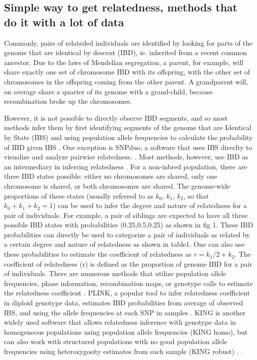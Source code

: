 \documentclass[12pt, letterpaper]{article}
\begin{document}
\subsection{Simple way to get relatedness, methods that do it with a lot of data}
Commonly, pairs of relateded individuals are  identified by looking for parts of the genome that are identical by descent (IBD), ie. inherited from a recent common ancestor. Due to the laws of Mendelian segregation, a parent, for example, will share exactly one set of chromosome IBD with its offspring, with the other set of chromosomes in the offspring coming from the other parent. A grandparent will, on average share a quarter of its genome with a grand-child, because recombination broke up the chromosomes.

However, it is not possible to directly observe IBD segments, and so most methods infer them by first identifying segments of the genome that are Identical by State (IBS) and using population allele frequencies to calculate the probability of IBD given IBS \cite{vai_kinship_2020}.  One exception is SNPduo, a software that uses IBS direclty to visualize and analyze pairwise relatedness. \cite{roberson_visualization_2009}. Most methods, however, use IBD as an intermediary in inferring relatedness \cite{boehnke_accurate_1997,lynch_estimation_1999,mcpeek_statistical_2000}. For a non-inbred population, there are three IBD states possible: either no chromosomes are shared, only one chromosome is shared, or both chromosomes are shared. The genome-wide proportions of these states (usually referred to as $k_0$, $k_1$, $k_2$, so that $k_0+k_1+k_2=1$) can be used to infer the degree and nature of relatedness for a pair of individuals. For example, a pair of siblings are expected to have all three possible IBD states with probabilities (0.25,0.5,0.25) as shown in fig 1. These IBD probabilities can directly be used to categorize a pair of individuals as related by a certain degree and nature of relatedness as shown in table1. One can also use these probabilities to estimate the coefficient of relatedness as $r= k_1/2 + k_2$. The coefficient of relatedness (r) is defined as the proportion of genome IBD for a pair of individuals.
There are numerous methods that utilize population allele frequencies, phase information, recombination maps, or genotype calls to estimate the relatedness coefficient \cite{huff_maximum-likelihood_2011,li_relationship_2014,li_accurate_2014,thornton_estimating_2012}. PLINK, a popular tool to infer relatedness coefficient in  diploid genotype data, estimates IBD probabilities from average of observed IBS, and using the allele frequencies at each SNP in samples \cite{purcell_plink_2007}. KING is another widely used software that allows relatedness inference with genotype data in homogeneous populations using population allele frequencies (KING homo), but can also work with structured populations with no good population allele frequencies using heterozygosity estimates from each sample (KING robust) \cite{manichaikul_robust_2010}. . 
\end{document}
